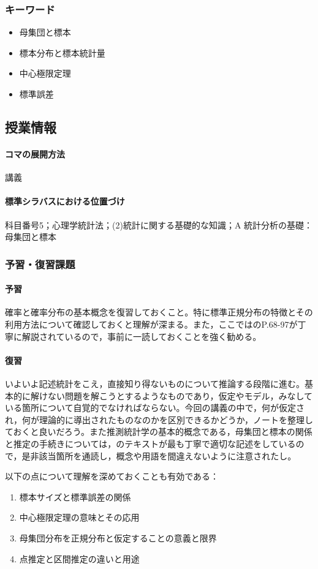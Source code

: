 \subsubsection{キーワード}
\begin{itemize}
	\item 母集団と標本
	\item 標本分布と標本統計量
	\item 中心極限定理
	\item 標準誤差
\end{itemize}
\subsection{授業情報}
\paragraph{コマの展開方法}
講義
\paragraph{標準シラバスにおける位置づけ}
科目番号5；心理学統計法；(2)統計に関する基礎的な知識；A 統計分析の基礎：母集団と標本
\subsubsection{予習・復習課題}
\paragraph{予習}
確率と確率分布の基本概念を復習しておくこと。特に標準正規分布の特徴とその利用方法について確認しておくと理解が深まる。また，ここでは\textcite{Yamada2004}のP.68-97が丁寧に解説されているので，事前に一読しておくことを強く勧める。
\paragraph{復習}
いよいよ記述統計をこえ，直接知り得ないものについて推論する段階に進む。基本的に解けない問題を解こうとするようなものであり，仮定やモデル，みなしている箇所について自覚的でなければならない。今回の講義の中で，何が仮定され，何が理論的に導出されたものなのかを区別できるかどうか，ノートを整理しておくと良いだろう。また推測統計学の基本的概念である，母集団と標本の関係と推定の手続きについては，\textcite{Yamada2004}のテキストが最も丁寧で適切な記述をしているので，是非該当箇所を通読し，概念や用語を間違えないように注意されたし。

以下の点について理解を深めておくことも有効である：
\begin{enumerate}
\item 標本サイズと標準誤差の関係
\item 中心極限定理の意味とその応用
\item 母集団分布を正規分布と仮定することの意義と限界
\item 点推定と区間推定の違いと用途
\end{enumerate}